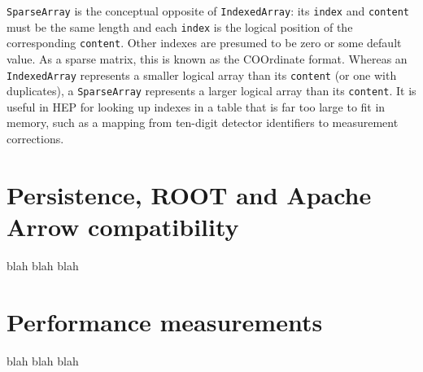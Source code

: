 \documentclass{webofc}
\begin{document}
{\tt\small SparseArray} is the conceptual opposite of {\tt\small IndexedArray}: its {\tt\small index} and {\tt\small content} must be the same length and each {\tt\small index} is the logical position of the corresponding {\tt\small content}. Other indexes are presumed to be zero or some default value. As a sparse matrix, this is known as the COOrdinate format. Whereas an {\tt\small IndexedArray} represents a smaller logical array than its {\tt\small content} (or one with duplicates), a {\tt\small SparseArray} represents a larger logical array than its {\tt\small content}. It is useful in HEP for looking up indexes in a table that is far too large to fit in memory, such as a mapping from ten-digit detector identifiers to measurement corrections.

\section{Persistence, ROOT and Apache Arrow compatibility}

blah blah blah

\section{Performance measurements}

blah blah blah
\end{document}
